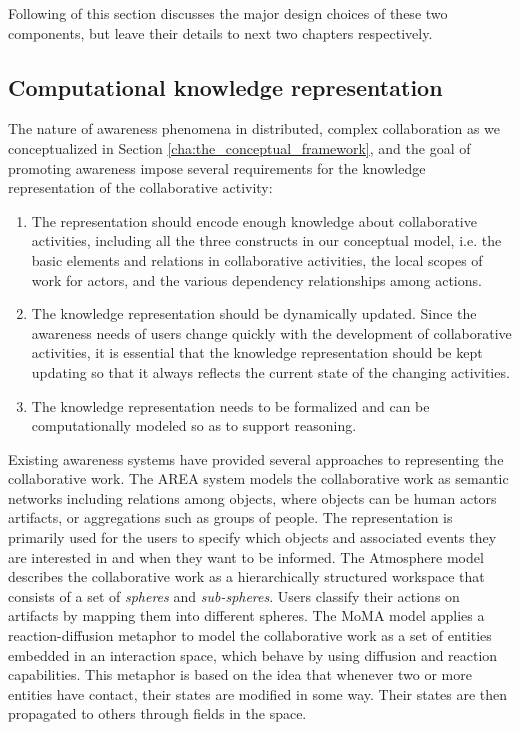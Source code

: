Following of this section discusses the major design choices of these two components, but leave their details to next two chapters respectively.

\subsection{Computational knowledge representation} %
\label{sub:computational_knowledge_representation}
The nature of awareness phenomena in distributed, complex collaboration as we conceptualized in Section \ref{cha:the_conceptual_framework}, and the goal of promoting awareness impose several requirements for the knowledge representation of the collaborative activity:

\begin{enumerate}
   \item The representation should encode enough knowledge about collaborative activities, including all the three constructs in our conceptual model, i.e. the basic elements and relations in collaborative activities, the local scopes of work for actors, and the various dependency relationships among actions. 
   \item The knowledge representation should be dynamically updated. Since the awareness needs of users change quickly with the development of collaborative activities, it is essential that the knowledge representation should be kept updating so that it always reflects the current state of the changing activities.
   \item The knowledge representation needs to be formalized and can be computationally modeled so as to support reasoning.
\end{enumerate}

Existing awareness systems have provided several approaches to representing the collaborative work. The AREA system \cite{fuchs1999a} models the collaborative work as semantic networks including relations among objects, where objects can be human actors artifacts, or aggregations such as groups of people. The representation is primarily used for the users to specify which objects and associated events they are interested in and when they want to be informed. The Atmosphere model \cite{Rittenbruch2002} describes the collaborative work as a hierarchically structured workspace that consists of a set of \emph{spheres} and \emph{sub-spheres}. Users classify their actions on artifacts by mapping them into different spheres. The MoMA model \cite{simone2002a} applies a reaction-diffusion metaphor to model the collaborative work as a set of entities embedded in an interaction space, which behave by using diffusion and reaction capabilities. This metaphor is based on the idea that whenever two or more entities have contact, their states are modified in some way. Their states are then propagated to others through fields in the space.  

